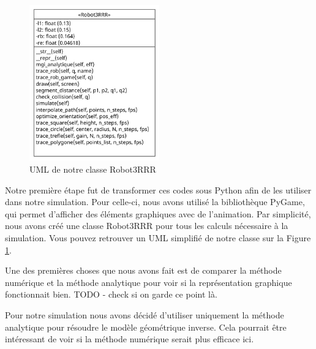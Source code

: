 \documentclass[a4paper, 11pt]{report}
\begin{document}
\begin{figure}[!htb]
    \centering
    \includegraphics[width=0.5\textwidth]{Figures/robot_3rrr_uml.pdf}
    \caption{UML de notre classe Robot3RRR}
    \label{fig:uml_class}
\end{figure}
Notre première étape fut de transformer ces codes sous Python afin de les utiliser dans notre simulation. Pour celle-ci, nous avons utilisé la bibliothèque PyGame, qui permet d'afficher des éléments graphiques avec de l'animation. Par simplicité, nous avons créé une classe Robot3RRR pour tous les calculs nécessaire à la simulation. Vous pouvez retrouver un UML simplifié de notre classe sur la Figure \ref{fig:uml_class}.

Une des premières choses que nous avons fait est de comparer la méthode numérique et la méthode analytique pour voir si la représentation graphique fonctionnait bien. TODO - check si on garde ce point là.

Pour notre simulation nous avons décidé d'utiliser uniquement la méthode analytique pour résoudre le modèle géométrique inverse. Cela pourrait être intéressant de voir si la méthode numérique serait plus efficace ici.
\end{document}
